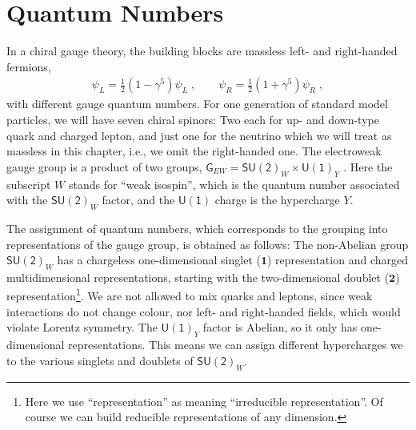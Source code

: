 \documentclass[12pt]{report}
\newcommand{\2}{\ensuremath{\sqrt{2}\,}}
\begin{document}
{         
    \section{Quantum Numbers}
      In a chiral gauge theory, the building blocks are massless left- and right-handed
      fermions, 
      \begin{align}
        \psi_L=\frac{1}{2}\left(1-\gamma^5\right) \psi_L\; , \qquad  
           \psi_R=\frac{1}{2}\left(1+\gamma^5\right) \psi_R \; ,
      \end{align}
      with different gauge quantum numbers. For one generation of standard model
      particles, we will have seven chiral spinors: Two each for up- and down-type quark and charged
      lepton, and just one for the neutrino which we will treat as massless in this chapter, i.e.,
      we omit the right-handed one. The electroweak gauge group is a product of two groups,
      $\mathsf{G}_{EW}=\mathsf{SU(2)}_W \times \mathsf{U(1)}_Y$
      . Here the subscript $W$ stands for 
      ``weak isospin'', which is the quantum number associated with the $\mathsf{SU(2)}_W$ factor, and
      the $\mathsf{U(1)}$ charge is the hypercharge $Y$.  
      
      The assignment of quantum numbers, which corresponds to the grouping into representations of 
      the gauge group, is obtained as follows: The non-Abelian group $\mathsf{SU(2)}_W$ has a chargeless 
      one-dimensional singlet ($\mathbf{1}$) representation and charged multidimensional representations,
      starting with the two-dimensional doublet ($\mathbf{2}$) representation\footnote{Here we use
        ``representation'' as meaning ``irreducible representation''. Of course we can build
        reducible representations of any dimension.}. We are not allowed to mix
      quarks and leptons, since weak interactions do not change colour, nor
      left- and right-handed fields, which would violate Lorentz symmetry. 
      The $\mathsf{U(1)}_Y$ factor is Abelian, so it only has
      one-dimensional representations. This means we can assign different hypercharges we to the
      various singlets and doublets of $\mathsf{SU(2)}_W$.

}
\end{document}
